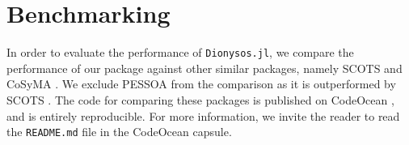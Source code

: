 \documentclass{juliacon}
\begin{document}

\section{Benchmarking}
\label{sec:benchmarks}

In order to evaluate the performance of \texttt{Dionysos.jl}, we compare the performance of our package against other similar packages, namely SCOTS \cite{rungger2016scots} and CoSyMA \cite{mouelhi2013cosyma}. We exclude PESSOA \cite{mazo2010pessoa, Roy2011} from the comparison as it is outperformed by SCOTS \cite{rungger2016scots}. The code for comparing these packages is published on CodeOcean \cite{Calbert2024}, and is entirely reproducible. For more information, we invite the reader to read the \texttt{README.md} file in the CodeOcean capsule.
\end{document}
